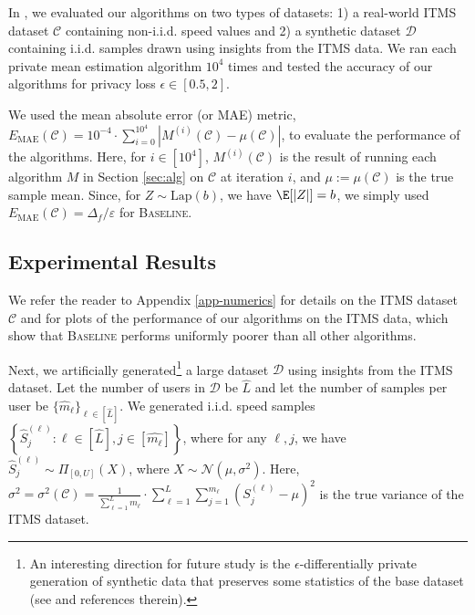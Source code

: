 {In \cite{dp_spcom}, we evaluated our algorithms on two types of datasets: 1) a real-world ITMS dataset $\mathcal{C}$ containing non-i.i.d. speed values and 2) a synthetic dataset $\mathcal{D}$ containing i.i.d. samples drawn using insights from the ITMS data. We ran each private mean estimation algorithm $10^4$ times and tested the accuracy of our algorithms for privacy loss $\epsilon\in [0.5,2]$.}

We used the mean absolute error (or MAE) metric, $E_\text{MAE}(\mathcal{C}) = 10^{-4}\cdot {{\sum_{i=0}^{10^4} \left \lvert M^{(i)}(\mathcal{C}) - \mu(\mathcal{C})\right \lvert}}$, to evaluate the performance of the algorithms. Here, for $i\in [10^4]$, $M^{(i)}(\mathcal{C})$ is the result of running each algorithm $M$ in Section \ref{sec:alg} on  $\mathcal{C}$ at iteration $i$, and $\mu:=\mu(\mathcal{C})$ is the true sample mean. Since, for $Z\sim \text{Lap}(b)$, we have $\E[|Z|] = b$, we simply used $E_\text{MAE}(\mathcal{C}) = \Delta_f/\varepsilon$ for \textsc{Baseline}.

\subsection{Experimental Results}
We refer the reader to Appendix \ref{app-numerics} for details on the ITMS dataset $\mathcal{C}$ and for plots of the performance of our algorithms on the ITMS data, which show that \textsc{Baseline} performs uniformly poorer than all other algorithms.

Next, we artificially generated\footnote{An interesting direction for future study is the $\epsilon$-differentially private generation of synthetic data that preserves some statistics of the base dataset (see \cite{vershynindp} and references therein).} a large dataset ${\mathcal{D}}$ using insights from the ITMS dataset. Let the number of users in $\mathcal{D}$ be $\widehat{L}$ and let the number of samples per user be $\{\widehat{m}_\ell\}_{\ell\in [\widehat{L}]}$.
We generated i.i.d. speed samples $\left\{\widehat{S}_j^{(\ell)}: \ell \in [\widehat{L}], j\in [\widehat{m_\ell}]\right\}$, where for any $\ell, j$, we have $\widehat{S}_j^{(\ell)}\sim \Pi_{[0,U]}(X)$, where $X\sim \mathcal{N}(\mu,\sigma^2)$. Here, 
$
\sigma^2 = \sigma^2(\mathcal{C}) = \frac{1}{\sum_{\ell=1}^{L}{m_\ell}}\cdot \sum_{\ell=1}^L \sum_{j=1}^{m_\ell}\left(S_j^{(\ell)}-\mu\right)^2
$
is the true variance of the ITMS dataset. 

